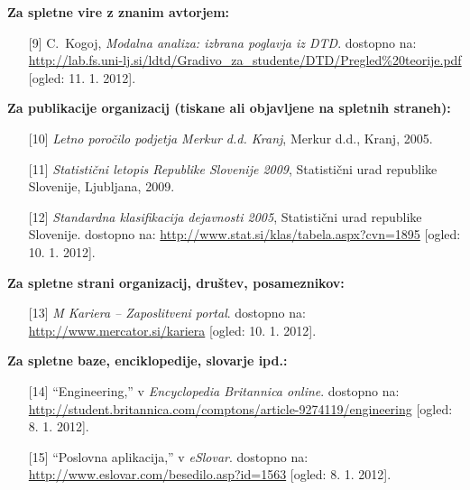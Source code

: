 \textbf{Za spletne vire z znanim avtorjem:}
\begin{itemize}
	\item[{[9]}]C.~Kogoj, \emph{Modalna analiza: izbrana poglavja iz {DTD}}. 
	dostopno na: 
	\url{http://lab.fs.uni-lj.si/ldtd/Gradivo_za_studente/DTD/Pregled\%20teorije.pdf}
	[ogled: 11. 1. 2012].
\end{itemize}

\textbf{Za publikacije organizacij (tiskane ali objavljene na spletnih 
	straneh):}
\begin{itemize}
	\item[{[10]}] \emph{Letno poročilo podjetja {M}erkur d.d. {K}ranj}, {Merkur 
		d.d., Kranj}, 2005.\\
	
	\item[{[11]}] \emph{{Statistični letopis Republike Slovenije 2009}}, 
	Statistični urad republike Slovenije, Ljubljana, 2009.\\
	
	\item[{[12]}]\emph{Standardna klasifikacija dejavnosti 2005}, {Statistični 
	urad 
		republike Slovenije}. dostopno na: 
	\url{http://www.stat.si/klas/tabela.aspx?cvn=1895}
	[ogled: 10. 1. 2012].
\end{itemize}

\textbf{Za spletne strani organizacij, društev, posameznikov:}
\begin{itemize}
	\item[{[13]}] \emph{M Kariera – Zaposlitveni portal}. dostopno na:
	\url{http://www.mercator.si/kariera} [ogled: 10. 1. 2012].
\end{itemize}

\textbf{Za spletne baze, enciklopedije, slovarje ipd.:}
\begin{itemize}
	\item[{[14]}] ``Engineering,'' v \emph{Encyclopedia Britannica online}. 
	dostopno na:
	\url{http://student.britannica.com/comptons/article-9274119/engineering}
	[ogled: 8. 1. 2012].\\
	
	\item[{[15]}] ``Poslovna aplikacija,'' v \emph{eSlovar}. dostopno na:
	\url{http://www.eslovar.com/besedilo.asp?id=1563} [ogled: 8. 1. 2012].
\end{itemize}

